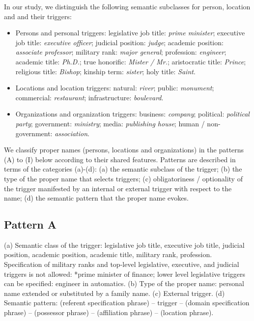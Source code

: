 \documentclass[output=paper]{langsci/langscibook}
\begin{document}
In our study, we distinguish the following semantic subclasses for
person, location and  and their triggers:

\begin{itemize}
\item Persons and personal triggers: legislative job title: \textit{prime
minister}; executive job title: \textit{executive officer}; judicial
position: \textit{judge}; academic position: \textit{associate
professor}; military rank: \textit{major general}; profession:
\textit{engineer}; academic title: \textit{Ph.D.}; true honorific:
\textit{Mister / Mr.}; aristocratic title: \textit{Prince}; religious
title: \textit{Bishop}; kinship term: \textit{sister}; holy title:
\textit{Saint}.
\item Locations and location triggers: natural: \textit{river}; public:
\textit{monument}; commercial: \textit{restaurant}; infrastructure:
\textit{boulevard}.
\item Organizations and organization triggers: business: \textit{company};
political: \textit{political party}; government: \textit{ministry};
media: \textit{publishing house}; human / non-government:
\textit{association}.
\end{itemize}

We classify proper names (persons, locations and organizations) in the
patterns (A) to (I) below according to their shared features.
Patterns are described in terms of the categories (a)-(d): (a) the
semantic subclass of the trigger; (b) the type of the proper name that
selects triggers; (c) obligatoriness / optionality of the trigger
manifested by an internal or external trigger with respect to the name;
(d) the semantic pattern that the proper name evokes.





\subsection{Pattern A}

(a) Semantic class of the trigger: legislative job title, executive job
title, judicial position, academic position, academic title, military
rank, profession. Specification of military ranks and top-level
legislative, executive, and judicial triggers is not allowed: *prime
minister of finance; lower level legislative triggers can be specified:
engineer in automatics. (b) Type of the proper name: personal name
extended or substituted by a family name. (c) External trigger. (d)
Semantic pattern: (referent specification phrase) – trigger – (domain
specification phrase) – (possessor phrase) – (affiliation phrase) –
(location phrase).
\end{document}
